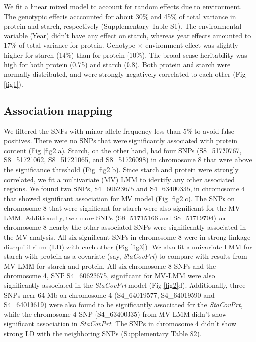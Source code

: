 \documentclass[10pt,letterpaper]{article}
\begin{document}
We fit a linear mixed model to account for random effects due to environment. The genotypic effects acccounted for about 30\% and 45\% of total variance in protein and starch, respectively (Supplementary Table S1). The environmental variable (Year) didn't have any effect on starch, whereas year effects amounted to 17\% of total variance for protein. Genotype $\times$ environment effect was slightly higher for starch (14\%) than for protein (10\%). The broad sense heritability was high for both protein (0.75) and starch (0.8). Both protein and starch were normally distributed, and were strongly negatively correlated to each other (Fig \ref{fig1}).

\subsection*{Association mapping}
We filtered the SNPs with minor allele frequency less than 5\% to avoid false positives. There were no SNPs that were significantly associated with protein content (Fig \ref{fig2}a). Starch, on the other hand, had four SNPs (S8\_51720767, S8\_51721062, S8\_51721065, and S8\_51726098) in chromosome 8 that were above the significance threshold (Fig \ref{fig2}b). Since starch and protein were strongly correlated, we fit a multivariate (MV) LMM to identify any other associated regions. We found two SNPs, S4\_60623675 and S4\_63400335, in chromosome 4 that showed significant association for MV model (Fig \ref{fig2}c). The SNPs on chromosome 8 that were significant for starch were also significant for the MV-LMM. Additionally, two more SNPs (S8\_51715166 and S8\_51719704) on chromosome 8 nearby the other associated SNPs were significantly associated in the MV analysis. All six significant SNPs in chromosome 8 were in strong linkage disequilibrium (LD) with each other (Fig \ref{fig3}). We also fit a univariate LMM for starch with protein as a covariate (say, \textit{StaCovPrt}) to compare with results from MV-LMM for starch and protein. All six chromosome 8 SNPs and the chromosome 4, SNP S4\_60623675, significant for MV-LMM were also significantly associated in the \textit{StaCovPrt} model (Fig \ref{fig2}d). Additionally, three SNPs near 64 Mb on chromosome 4 (S4\_64019577, S4\_64019590 and S4\_64019619) were also found to be significantly associated for the \textit{StaCovPrt}, while the chromosome 4 SNP (S4\_63400335) from MV-LMM didn't show significant association in \textit{StaCovPrt}. The SNPs in chromosome 4 didn't show strong LD with the neighboring SNPs (Supplementary Table S2).
\end{document}
